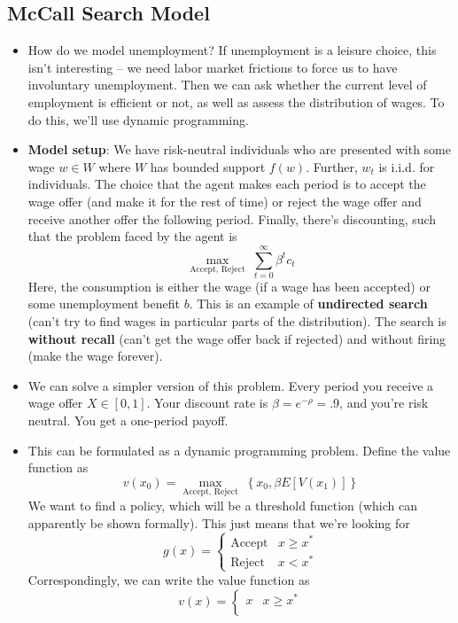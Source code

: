 \documentclass[12pt]{article}
\begin{document}
\subsection{McCall Search Model}

\begin{itemize}
    \item How do we model unemployment? If unemployment is a leisure choice, this isn't interesting -- we need labor market frictions to force us to have involuntary unemployment. Then we can ask whether the current level of employment is efficient or not, as well as assess the distribution of wages. To do this, we'll use dynamic programming. 
    \item \textbf{Model setup}: We have risk-neutral individuals who are presented with some wage $w \in W$ where $W$ has bounded support $f(w)$. Further, $w_t$ is i.i.d. for individuals. The choice that the agent makes each period is to accept the wage offer (and make it for the rest of time) or reject the wage offer and receive another offer the following period. Finally, there's discounting, such that the problem faced by the agent is
    \[\max_{\text{Accept, Reject}}\;\sum_{t=0}^{\infty} \beta^tc_t\]
    Here, the consumption is either the wage (if a wage has been accepted) or some unemployment benefit $b$. This is an example of \textbf{undirected search} (can't try to find wages in particular parts of the distribution). The search is \textbf{without recall} (can't get the wage offer back if rejected) and without firing (make the wage forever).
    \item We can solve a simpler version of this problem. Every period you receive a wage offer $X \in [0,1]$. Your discount rate is $\beta = e^{-\rho} = .9$, and you're risk neutral. You get a one-period payoff.
    \item This can be formulated as a dynamic programming problem. Define the value function as 
    \[v(x_0) = \max_{\text{Accept, Reject}}\; \left\{x_0, \beta E[V(x_1)]\right\}\]
    We want to find a policy, which will be a threshold function (which can apparently be shown formally). This just means that we're looking for 
    \[g(x) = \begin{cases}
    \text{Accept} & x \geq x^* \\
    \text{Reject} & x < x^*
    \end{cases}\]
    Correspondingly, we can write the value function as 
    \[v(x) = \begin{cases}
    x & x \geq x^* \\

\end{cases}\]
\end{itemize}
\end{document}
